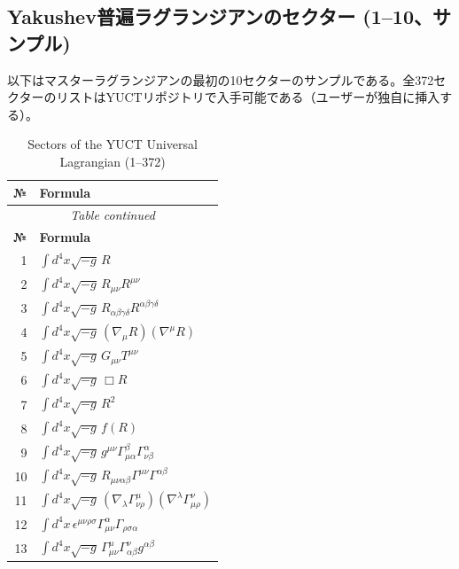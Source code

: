\documentclass[11pt,a4paper]{article}
\begin{document}
	\subsection{Yakushev普遍ラグランジアンのセクター (1–10、サンプル)}
	\label{sec:sectors}
	
	以下はマスターラグランジアンの最初の10セクターのサンプルである。全372セクターのリストはYUCTリポジトリで入手可能である（ユーザーが独自に挿入する）。
	
	\scriptsize
\begin{longtable}{r p{}}
	\caption{Sectors of the YUCT Universal Lagrangian (1–372)}\label{tab:sectors-100}\\
	\toprule
	\textbf{№} & \textbf{Formula} \\
	\midrule
	\endfirsthead
	\multicolumn{2}{c}{\textit{Table continued}}\\
	\toprule
	\textbf{№} & \textbf{Formula} \\
	\midrule
	\endhead
	\bottomrule
	\endfoot
	1 & \(\displaystyle \int d^4x\sqrt{-g}\,R\) \\
	2 & \(\displaystyle \int d^4x\sqrt{-g}\,R_{\mu\nu}R^{\mu\nu}\) \\
	3 & \(\displaystyle \int d^4x\sqrt{-g}\,R_{\alpha\beta\gamma\delta}R^{\alpha\beta\gamma\delta}\) \\
	4 & \(\displaystyle \int d^4x\sqrt{-g}\,(\nabla_\mu R)(\nabla^\mu R)\) \\
	5 & \(\displaystyle \int d^4x\sqrt{-g}\,G_{\mu\nu}T^{\mu\nu}\) \\
	6 & \(\displaystyle \int d^4x\sqrt{-g}\,\Box R\) \\
	7 & \(\displaystyle \int d^4x\sqrt{-g}\,R^2\) \\
	8 & \(\displaystyle \int d^4x\sqrt{-g}\,f(R)\) \\
	9 & \(\displaystyle \int d^4x\sqrt{-g}\,g^{\mu\nu}\Gamma^{\beta}_{\mu\alpha}\Gamma^{\alpha}_{\nu\beta}\) \\
	10 & \(\displaystyle \int d^4x\sqrt{-g}\,R_{\mu\nu\alpha\beta}\Gamma^{\mu\nu}\Gamma^{\alpha\beta}\) \\
	11 & \(\displaystyle \int d^4x\sqrt{-g}\,(\nabla_\lambda\Gamma^{\mu}_{\nu\rho})(\nabla^\lambda\Gamma^{\nu}_{\mu\rho})\) \\
	12 & \(\displaystyle \int d^4x\,\epsilon^{\mu\nu\rho\sigma}\Gamma^{\alpha}_{\mu\nu}\Gamma_{\rho\sigma\alpha}\) \\
	13 & \(\displaystyle \int d^4x\sqrt{-g}\,\Gamma^{\mu}_{\mu\nu}\Gamma^{\nu}_{\alpha\beta}g^{\alpha\beta}\) \\

\end{longtable}
\end{document}
